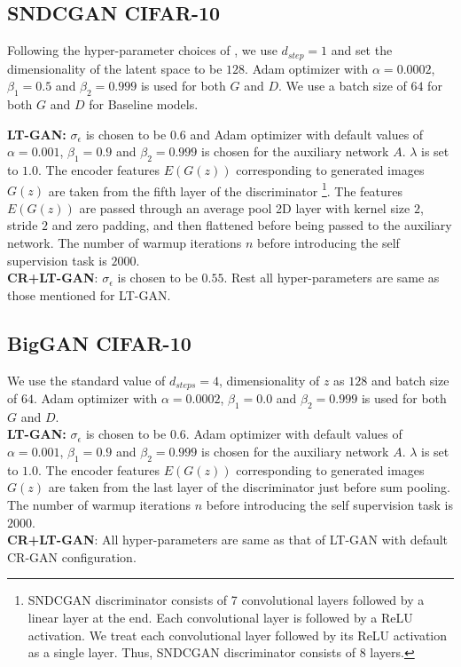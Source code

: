 \documentclass[10pt,twocolumn,letterpaper]{article}
\begin{document}
\subsection{SNDCGAN CIFAR-10} 
Following the hyper-parameter choices of \cite{crgan2019chen}, we use $d_{step} = 1$ and set the dimensionality of the latent space to be $128$. Adam optimizer with $\alpha=0.0002$, $\beta_1=0.5$ and $\beta_2=0.999$ is used for both $G$ and $D$. We use a batch size of $64$ for both $G$ and $D$ for Baseline models. 

\textbf{LT-GAN:}
$\sigma_\epsilon$ is chosen to be $0.6$ and Adam optimizer with default values of $\alpha=0.001$, $\beta_1=0.9$ and $\beta_2=0.999$ is chosen for the auxiliary network $A$. $\lambda$ is set to $1.0$. The encoder features $E(G(z))$ corresponding to generated images $G(z)$ are taken from the fifth layer of the discriminator \footnote{SNDCGAN discriminator consists of 7 convolutional layers followed by a linear layer at the end. Each convolutional layer is followed by a ReLU activation. We treat each convolutional layer followed by its ReLU activation as a single layer. Thus, SNDCGAN discriminator consists of 8 layers.}. The features $E(G(z))$ are passed through an average pool 2D layer with kernel size $2$, stride $2$ and zero padding, and then flattened before being passed to the auxiliary network. The number of warmup iterations $n$ before introducing the self supervision task is $2000$. 
\\

\textbf{CR+LT-GAN}:
$\sigma_\epsilon$ is chosen to be $0.55$. Rest all hyper-parameters are same as those mentioned for LT-GAN.


\subsection{BigGAN CIFAR-10}
We use the standard value\cite
{biggan2018brock} of $d_{steps} = 4$, dimensionality of $z$ as $128$ and batch size of $64$. Adam optimizer with $\alpha=0.0002$, $\beta_1=0.0$ and $\beta_2=0.999$ is used for both $G$ and $D$.\\
\vspace{-2pt}
\indent \textbf{LT-GAN:}
$\sigma_\epsilon$ is chosen to be $0.6$. Adam optimizer with default values of $\alpha=0.001$, $\beta_1=0.9$ and $\beta_2=0.999$ is chosen for the auxiliary network $A$. $\lambda$ is set to $1.0$. The encoder features $E(G(z))$ corresponding to generated images $G(z)$ are taken from the last layer of the discriminator just before sum pooling. The number of warmup iterations $n$ before introducing the self supervision task is $2000$. 
\\
\indent \textbf{CR+LT-GAN}: All hyper-parameters are same as that of LT-GAN with default CR-GAN configuration.
\end{document}
